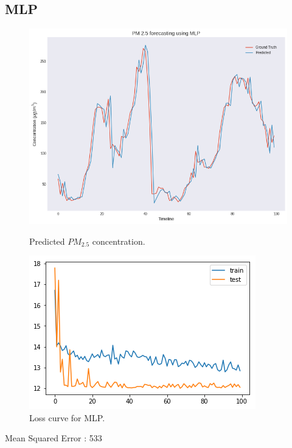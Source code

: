 \documentclass{report}
\begin{document}
\subsection{MLP}
\begin{figure}[htbp]
	\centering
	\includegraphics[scale=0.5]{Images/mlp}
	\caption{Predicted $PM_{2.5}$ concentration.}
	\label{fig}

	\centering
	\includegraphics[scale=0.65]{Images/mlp_loss}
	\caption{Loss curve for MLP.}
	\label{fig}
\end{figure}
Mean Squared Error : 533
\newpage
\end{document}

